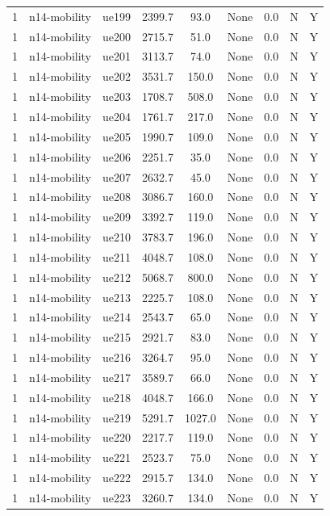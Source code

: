 \begin{table}[ht]
\begin{tabular}{|c|c|c|c|c|c|c|c|c|}
1 & n14-mobility & ue199 & 2399.7 & 93.0 & None & 0.0 & N & Y \\
1 & n14-mobility & ue200 & 2715.7 & 51.0 & None & 0.0 & N & Y \\
1 & n14-mobility & ue201 & 3113.7 & 74.0 & None & 0.0 & N & Y \\
1 & n14-mobility & ue202 & 3531.7 & 150.0 & None & 0.0 & N & Y \\
1 & n14-mobility & ue203 & 1708.7 & 508.0 & None & 0.0 & N & Y \\
1 & n14-mobility & ue204 & 1761.7 & 217.0 & None & 0.0 & N & Y \\
1 & n14-mobility & ue205 & 1990.7 & 109.0 & None & 0.0 & N & Y \\
1 & n14-mobility & ue206 & 2251.7 & 35.0 & None & 0.0 & N & Y \\
1 & n14-mobility & ue207 & 2632.7 & 45.0 & None & 0.0 & N & Y \\
1 & n14-mobility & ue208 & 3086.7 & 160.0 & None & 0.0 & N & Y \\
1 & n14-mobility & ue209 & 3392.7 & 119.0 & None & 0.0 & N & Y \\
1 & n14-mobility & ue210 & 3783.7 & 196.0 & None & 0.0 & N & Y \\
1 & n14-mobility & ue211 & 4048.7 & 108.0 & None & 0.0 & N & Y \\
1 & n14-mobility & ue212 & 5068.7 & 800.0 & None & 0.0 & N & Y \\
1 & n14-mobility & ue213 & 2225.7 & 108.0 & None & 0.0 & N & Y \\
1 & n14-mobility & ue214 & 2543.7 & 65.0 & None & 0.0 & N & Y \\
1 & n14-mobility & ue215 & 2921.7 & 83.0 & None & 0.0 & N & Y \\
1 & n14-mobility & ue216 & 3264.7 & 95.0 & None & 0.0 & N & Y \\
1 & n14-mobility & ue217 & 3589.7 & 66.0 & None & 0.0 & N & Y \\
1 & n14-mobility & ue218 & 4048.7 & 166.0 & None & 0.0 & N & Y \\
1 & n14-mobility & ue219 & 5291.7 & 1027.0 & None & 0.0 & N & Y \\
1 & n14-mobility & ue220 & 2217.7 & 119.0 & None & 0.0 & N & Y \\
1 & n14-mobility & ue221 & 2523.7 & 75.0 & None & 0.0 & N & Y \\
1 & n14-mobility & ue222 & 2915.7 & 134.0 & None & 0.0 & N & Y \\
1 & n14-mobility & ue223 & 3260.7 & 134.0 & None & 0.0 & N & Y \\

\end{tabular}
\end{table}

